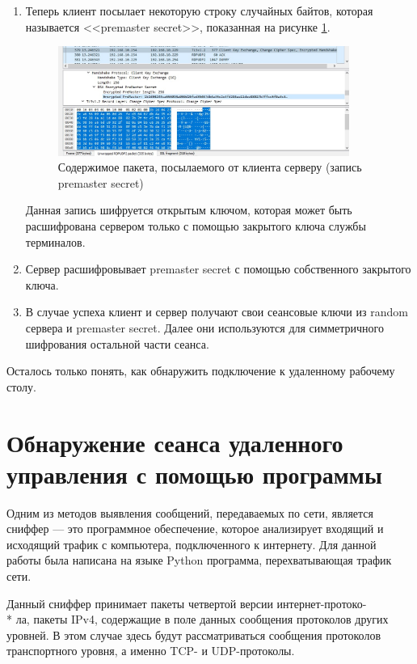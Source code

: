 \documentclass[bachelor, och, coursework]{SCWorks}
\begin{document}
\begin{enumerate}
    \item Теперь клиент посылает некоторую строку случайных байтов, которая называется <<premaster secret>>, показанная на рисунке \ref{cert1}. 
    
    \begin{figure}[H]
      \centering
      \includegraphics[width=0.9\textwidth]{photo/cert1.png}
      \caption{Содержимое пакета, посылаемого от клиента серверу (запись premaster secret)}
      \label{cert1}
    \end{figure}
    
    Данная запись шифруется открытым ключом, которая может быть расшифрована сервером только с помощью закрытого ключа службы терминалов.
    \item Сервер расшифровывает premaster secret с помощью собственного закрытого ключа.
    \item В случае успеха клиент и сервер получают свои сеансовые ключи из random сервера и premaster secret. Далее они используются для симметричного 
    шифрования остальной части сеанса.
  \end{enumerate}
  
  Осталось только понять, как обнаружить подключение к удаленному рабочему столу.

  \section{Обнаружение сеанса удаленного управления с помощью программы}
  
  Одним из методов выявления сообщений, передаваемых по сети, является сниффер --- это программное обеспечение, которое анализирует входящий
  и исходящий трафик с компьютера, подключенного к интернету. Для данной работы была написана на языке Python программа, перехватывающая
  трафик сети.
    
  Данный сниффер принимает пакеты четвертой версии интернет-протоко- \\* ла, пакеты IPv4, содержащие в поле данных сообщения протоколов
  других уровней. В этом случае здесь будут рассматриваться сообщения протоколов транспортного уровня, а именно TCP- и UDP-протоколы.
    
\end{document}
